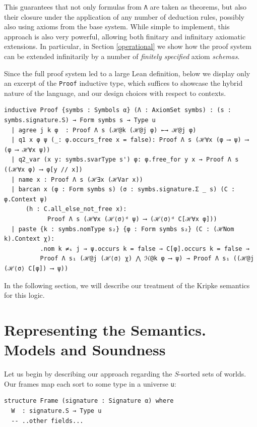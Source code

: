 \documentclass{easychair}
\theoremstyle{remark}
\begin{document}
This guarantees that not only formulas from \lstinline|Λ| are taken as theorems, but also their closure under the application of any number of deduction rules, possibly also using axioms from the base system. 
While simple to implement, this approach is also very powerful, allowing both finitary and infinitary axiomatic extensions. In particular, in Section \ref{operational} we show how the proof system can be extended infinitarily by a number of \textit{finitely specified} axiom \textit{schemas}.

 Since the full proof system led to a large Lean definition, below we display only an excerpt of the \lstinline|Proof| inductive type, which suffices to showcase the hybrid nature of the language, and our design choices with respect to contexts.

\begin{lstlisting}
inductive Proof {symbs : Symbols α} (Λ : AxiomSet symbs) : (s : symbs.signature.S) → Form symbs s → Type u
  | agree j k φ  : Proof Λ s (ℋ@k (ℋ@j φ) ←→ ℋ@j φ)
  | q1 x φ ψ (_: φ.occurs_free x = false): Proof Λ s (ℋ∀x (φ ⟶ ψ) ⟶ (φ ⟶ ℋ∀x ψ))
  | q2_var (x y: symbs.svarType s') φ: φ.free_for y x → Proof Λ s ((ℋ∀x φ) ⟶ φ[y // x])
  | name x : Proof Λ s (ℋ∃x (ℋVar x))
  | barcan x (φ : Form symbs s) (σ : symbs.signature.Σ _ s) (C : φ.Context ψ)
      (h : C.all_else_not_free x):
            Proof Λ s (ℋ∀x (ℋ⟨σ⟩ᵈ ψ) ⟶ (ℋ⟨σ⟩ᵈ C[ℋ∀x φ]))
  | paste {k : symbs.nomType s₂} {φ : Form symbs s₂} (C : (ℋNom k).Context χ):
          .nom k ≠ₛ j → ψ.occurs k = false → C[φ].occurs k = false →
          Proof Λ s₁ (ℋ@j (ℋ⟨σ⟩ χ) ⋀ ℋ@k φ ⟶ ψ) → Proof Λ s₁ ((ℋ@j (ℋ⟨σ⟩ C[φ]) ⟶ ψ))
\end{lstlisting}

In the following section, we will describe our treatment of the Kripke semantics for this logic.

\section{Representing the Semantics. Models and Soundness}\label{semantics}
Let us begin by describing our approach regarding the $S$-sorted sets of worlds. Our frames map each sort to some type in a universe \lstinline|u|:

\begin{lstlisting}
structure Frame (signature : Signature α) where
  W  : signature.S → Type u
  -- ..other fields...
\end{lstlisting}
\end{document}
